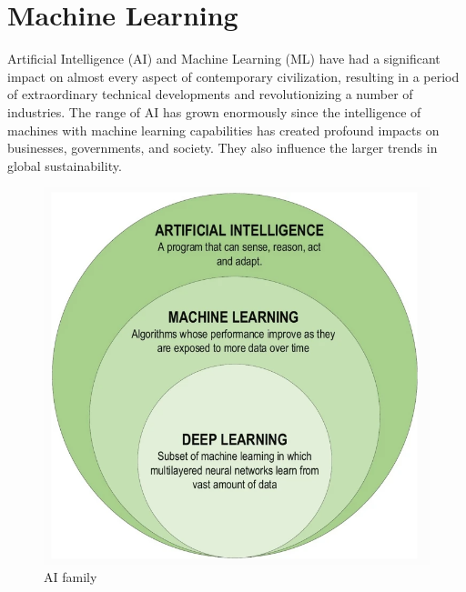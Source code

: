 \documentclass[a4paper,12pt]{report}%
\renewcommand{\\}{\vspace*{0.5\baselineskip} \newline}
\begin{document}
\section{Machine Learning}
Artificial Intelligence (AI) and Machine Learning (ML) have had a significant impact on almost every aspect of contemporary civilization, resulting in a period of extraordinary technical developments and revolutionizing a number of industries. The range of AI has grown enormously since the intelligence of machines with machine learning capabilities has created profound impacts on businesses, governments, and society. They also influence the larger trends in global sustainability. \cite{18}


\begin{figure}[h]
\centering
	\includegraphics[scale=0.5]{images/ai family.png}\\
	\begin{footnotesize}
		\caption{AI family \cite{10}}
		\label{AI family}
	\end{footnotesize}
\end{figure}
\end{document}
